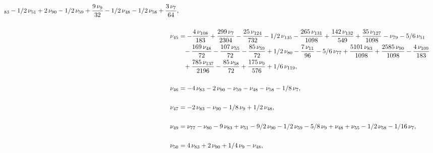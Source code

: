 \documentclass[a4paper,12pt, DIV=14, BCOR=5mm, twoside, headsepline]{scrbook}
\begin{document}
\begin{align}
\begin{aligned}
_{{83}}-1/2\,\nu_{{51}}+2\,\nu_{{90}}-1/2\,\nu_{{59}}+{\frac {9\,\nu_{
{9}}}{32}}-1/2\,\nu_{{48}}-1/2\,\nu_{{58}}+{\frac {3\,\nu_{{7}}}{64}},\\
\\
\nu_{{45}}&=-{\frac {4\,\nu_{{108}}}{183}}+{\frac {299\,\nu_{{7}}}{2304
}}-{\frac {25\,\nu_{{124}}}{732}}-1/2\,\nu_{{135}}-{\frac {265\,\nu_{{
131}}}{1098}}+{\frac {142\,\nu_{{132}}}{549}}+{\frac {35\,\nu_{{127}}
}{1098}}-\nu_{{79}}-5/6\,\nu_{{51}}\\
 &\hphantom{=}-{\frac {169\,\nu_{{48}}}{72}}-{
\frac {107\,\nu_{{55}}}{72}}-{\frac {85\,\nu_{{59}}}{72}}+1/2\,\nu_{{
80}}-{\frac {7\,\nu_{{11}}}{96}}-5/6\,\nu_{{77}}+{\frac {5101\,\nu_{{
83}}}{1098}}+{\frac {2585\,\nu_{{90}}}{1098}}-{\frac {4\,\nu_{{109}}}{
183}}\\
 &\hphantom{=}+{\frac {785\,\nu_{{137}}}{2196}}-{\frac {85\,\nu_{{58}}}{72}}+{
\frac {175\,\nu_{{9}}}{576}}+1/6\,\nu_{{119}}, \\
\\
\nu_{{46}}&=-4\,\nu_{{83}
}-2\,\nu_{{90}}-\nu_{{59}}-\nu_{{48}}-\nu_{{58}}-1/8\,\nu_{{7}},\\
\\
\nu_{{
47}}&=-2\,\nu_{{83}}-\nu_{{90}}-1/8\,\nu_{{9}}+1/2\,\nu_{{48}}, \\
\\
\nu_{{49
}}&=\nu_{{77}}-\nu_{{80}}-9\,\nu_{{83}}+\nu_{{51}}-9/2\,\nu_{{90}}-1/2
\,\nu_{{59}}-5/8\,\nu_{{9}}+\nu_{{48}}+\nu_{{55}}-1/2\,\nu_{{58}}-1/16
\,\nu_{{7}},  \\
\\
\nu_{{50}}&=4\,\nu_{{83}}+2\,\nu_{{90}}+1/4\,\nu_{{9}}-\nu_
{{48}},
\end{aligned}
\end{align}
\end{document}
